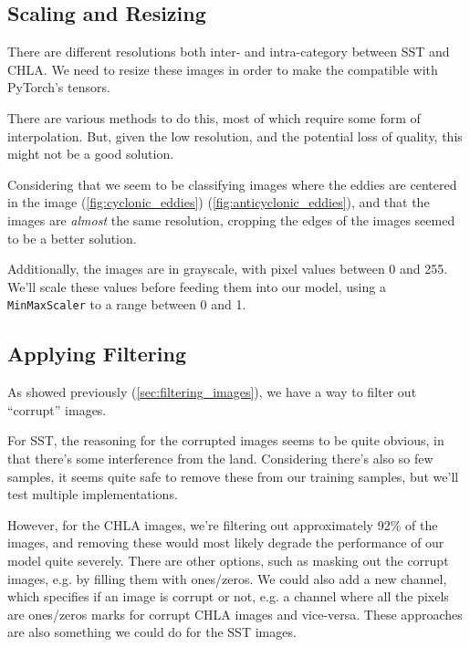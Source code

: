 \documentclass[12pt,a4paper,english]{article}
\begin{document}
    \subsection{Scaling and Resizing} \label{sec:scaling_and_resizing}

    There are different resolutions both inter- and intra-category between SST and CHLA.
    We need to resize these images in order to make the compatible with PyTorch's tensors.

    There are various methods to do this, most of which require some form of interpolation.
    But, given the low resolution, and the potential loss of quality, this might not be a good solution.

    Considering that we seem to be classifying images where the eddies are centered in the
    image (\ref{fig:cyclonic_eddies}) (\ref{fig:anticyclonic_eddies}), and that the images are \textit{almost} the same resolution,
    cropping the edges of the images seemed to be a better solution.

    Additionally, the images are in grayscale, with pixel values between 0 and 255.
    We'll scale these values before feeding them into our model, using a \verb|MinMaxScaler| to a range between 0 and 1.

    \subsection{Applying Filtering} \label{sec:applying_filtering}

    As showed previously (\ref{sec:filtering_images}), we have a way to filter out ``corrupt'' images.

    For SST, the reasoning for the corrupted images seems to be quite obvious, in that there's some interference from the land.
    Considering there's also so few samples, it seems quite safe to remove these from our training samples, but we'll test multiple implementations.

    However, for the CHLA images, we're filtering out approximately 92\% of the images, and removing these would most likely degrade the performance
    of our model quite severely. There are other options, such as masking out the corrupt images, e.g. by filling them with ones/zeros.
    We could also add a new channel, which specifies if an image is corrupt or not, e.g. a channel where all the pixels are ones/zeros marks for corrupt CHLA images
    and vice-versa. These approaches are also something we could do for the SST images.
\end{document}
